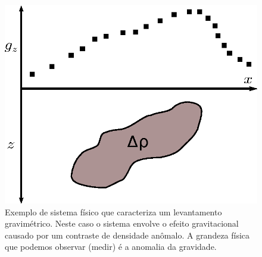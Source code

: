\begin{figure}
    \centering
    \includegraphics[scale=1]{../figs/system-grav.eps}
    \caption{Exemplo de sistema físico que caracteriza um levantamento
        gravimétrico. Neste caso o sistema envolve o efeito gravitacional
        causado por um contraste de densidade anômalo. A grandeza física que
        podemos observar (medir) é a anomalia da gravidade.}
    \label{system-grav}
\end{figure}


